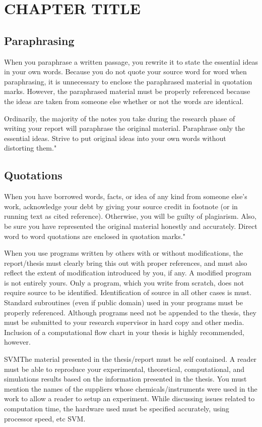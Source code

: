 \chapter{CHAPTER TITLE} \label{c3}
\section{Paraphrasing}
When you paraphrase a written passage, you rewrite it to state the essential ideas in your own words. Because you do not quote your source word for word when paraphrasing, it is unnecessary to enclose the paraphrased material in quotation marks. However, the paraphrased material must be properly referenced because the ideas are taken from someone else whether or not the words are identical. 

Ordinarily, the majority of the notes you take during the research phase of writing your report will paraphrase the original material. Paraphrase only the essential ideas. Strive to put original ideas into your own words without distorting them."

\section{Quotations}
When you have borrowed words, facts, or idea of any kind from someone else's work, acknowledge your debt by giving your source credit in footnote (or in running text as cited reference). Otherwise, you will be guilty of plagiarism. Also, be sure you have represented the original material honestly and accurately. Direct word to word quotations are enclosed in quotation marks."

When you use programs written by others with or without modifications, the report/thesis must clearly bring this out with proper references, and must also reflect the extent of modification introduced by you, if any. A modified program is not entirely yours. Only a program, which you write from scratch, does not require source to be identified. Identification of source in all other cases is must. Standard subroutines (even if public domain) used in your programs must be properly referenced. Although programs need not be appended to the thesis, they must be submitted to your research supervisor in hard copy and other media. Inclusion of a computational flow chart in your thesis is highly recommended, however. 

\gls{SVM}The material presented in the thesis/report must be self contained. A reader must be able to reproduce your experimental, theoretical, computational, and simulations results based on the information presented in the thesis. You must mention the names of the suppliers whose chemicals/instruments were used in the work to allow a reader to setup an experiment. While discussing issues related to computation time, the hardware used must be specified accurately, using processor speed, etc \gls{SVM}. 


